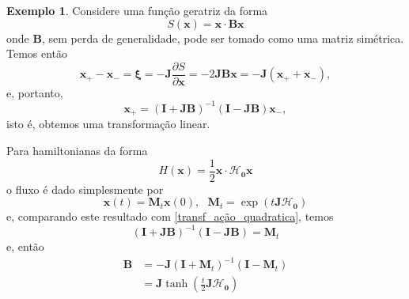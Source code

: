 \documentclass[
	12pt,
	oneside,			%
	a4paper,			%
	english,			%
	brazil				%
	]{abntex2}
\theoremstyle{definition}
\newtheorem{exmp}{Exemplo}[chapter]
\begin{document}
\begin{exmp}
    Considere uma função geratriz da forma
    \begin{equation}
        S(\mathbf{x}) =  \mathbf{x} \cdot \mathbf{B}\mathbf{x}
    \end{equation}
    onde $\mathbf{B}$, sem perda de generalidade, pode ser tomado como uma matriz simétrica. Temos então
    \begin{equation}
        \mathbf{x}_+ - \mathbf{x}_- = \boldsymbol{\xi} = -\mathbf{J} \frac{\partial S}{\partial \mathbf{x}} = -2\mathbf{J}\mathbf{B}\mathbf{x} = -\mathbf{J} \left(\mathbf{x}_+ + \mathbf{x}_-\right),
    \end{equation}
    e, portanto,
    \begin{equation}
        \label{transf_ação_quadratica}
        \mathbf{x}_+ = \left(\mathbf{I} + \mathbf{J}\mathbf{B}\right)^{-1}\left(\mathbf{I} - \mathbf{J}\mathbf{B}\right)\mathbf{x}_-,
    \end{equation}
    isto é, obtemos uma transformação linear.

    Para hamiltonianas da forma
    \begin{equation}
        H(\mathbf{x}) = \frac{1}{2} \mathbf{x} \cdot \boldsymbol{\mathcal{H}}_{\mathbf{0}} \mathbf{x}
    \end{equation}
    o fluxo é dado simplesmente por
    \begin{equation}
    \label{fluxo linear}
        \mathbf{x}(t) = \mathbf{M}_t \mathbf{x}(0), \ \ \ \mathbf{M}_t = \exp(t \mathbf{J} \boldsymbol{\mathcal{H}}_{\mathbf{0}})
    \end{equation}
    e, comparando este resultado com \eqref{transf_ação_quadratica}, temos
    \begin{equation}
        \left(\mathbf{I} + \mathbf{J}\mathbf{B}\right)^{-1}\left(\mathbf{I} - \mathbf{J}\mathbf{B}\right) = \mathbf{M}_t
    \end{equation}
    e, então
    \begin{equation}
        \begin{aligned}
            \boldsymbol{B} &= -\mathbf{J} (\mathbf{I}+\mathbf{M}_t)^{-1}(\mathbf{I}-\mathbf{M}_t) \\
            &= \mathbf{J}\tanh \left(\frac{t}{2}\mathbf{J} \boldsymbol{\mathcal{H}}_{\mathbf{0}}\right) \\
        \end{aligned}
    \end{equation}
\end{exmp}
\end{document}
